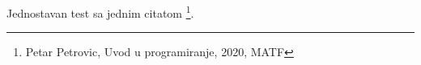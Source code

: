 \documentclass{article}
\begin{document}
Jednostavan test sa jednim citatom \footnote{Petar Petrovic, Uvod u programiranje, 2020, MATF}.
\end{document}
